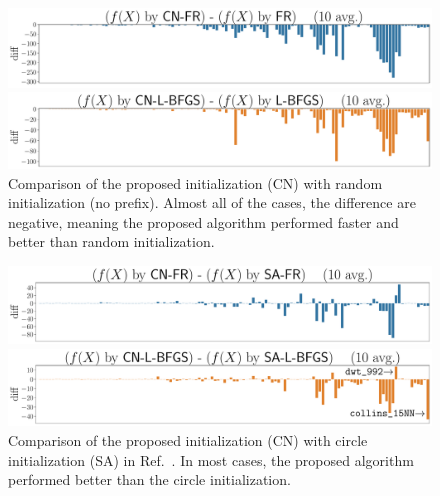 \documentclass[dvipdfmx,10pt,journal,compsoc]{IEEEtran}
\begin{document}
\begin{figure}[t]
  \centering
  \begin{minipage}{\columnwidth}
    \centering
    \includegraphics[width=\columnwidth]{overall/plot/diff_FR_50.pdf}
  \end{minipage}
  \begin{minipage}{\columnwidth}
    \centering
    \includegraphics[width=\columnwidth]{overall/plot/diff_L-BFGS_50.pdf}
  \end{minipage}
  \caption{
    Comparison of the proposed initialization (\textsf{CN}) with random initialization (no prefix).
    Almost all of the cases, the difference are negative, meaning the proposed algorithm performed faster and better than random initialization.
  }
  \label{fig:overall}
\end{figure}
\begin{figure}[!t]
  \centering
  \begin{minipage}{\columnwidth}
    \centering
    \includegraphics[width=\columnwidth]{circle/plot/diff_FR_50.pdf}
  \end{minipage}
  \begin{minipage}{\columnwidth}
    \centering
    \includegraphics[width=\columnwidth]{circle/plot/diff_L-BFGS_50.pdf}
  \end{minipage}
  \caption{
    Comparison of the proposed initialization (\textsf{CN}) with circle initialization (\textsf{SA}) in Ref.~\cite{ghassemitoosiSimulatedAnnealingPreProcessing2016}.
    In most cases, the proposed algorithm performed better than the circle initialization.
  }
  \label{fig:diff}
\end{figure}
\end{document}
